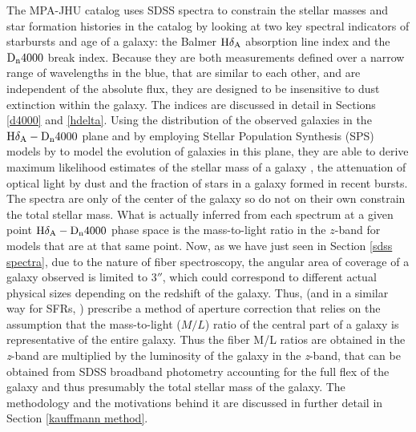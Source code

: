 The MPA-JHU catalog uses SDSS spectra to constrain the stellar masses and star formation histories in the catalog by looking at two key spectral indicators of starbursts and age of a galaxy: the Balmer ${\rm H}\delta_{\rm A}$ absorption line index and the ${\rm D}_{\rm n}4000$ break index.   Because they are both measurements defined over a narrow range of wavelengths in the blue, that are similar to each other, and are independent of the absolute flux, they are designed to be insensitive to dust extinction within the galaxy. The indices are discussed in detail in Sections \ref{d4000} and \ref{hdelta}. Using the distribution of the observed galaxies in the ${\rm H}\delta_{\rm A}-{\rm D}_{\rm n}4000$ plane and by employing Stellar Population Synthesis (SPS) models by \citet{bruzual_stellar_2003-1} to model the evolution of galaxies in this plane, they are able to derive maximum likelihood estimates of the stellar mass of a galaxy \citep{kauffmann_stellar_2003}, the attenuation of optical light by dust and the fraction of stars in a galaxy formed in recent bursts.\\

The spectra are only of the center of the galaxy so do not on their own constrain the total stellar mass. What is actually inferred from each spectrum at a given point ${\rm H}\delta_{\rm A}-{\rm D}_{\rm n}4000$ phase space is the mass-to-light ratio in the $z$-band for models that are at that same point. Now, as we have just seen in Section \ref{sdss spectra}, due to the nature of fiber spectroscopy, the angular area of coverage of a galaxy observed is limited to 3$''$, which could correspond to different actual physical sizes depending on the redshift of the galaxy. Thus, \citet{kauffmann_stellar_2003} (and in a similar way for SFRs, \citealt{brinchmann_physical_2004}) prescribe a method of aperture correction that relies on the assumption that the mass-to-light ($M/L$) ratio of the central part of a galaxy is representative of the entire galaxy. Thus the fiber M/L ratios are obtained in the \emph{z}-band are multiplied by the luminosity of the galaxy in the \emph{z}-band, that can be obtained from SDSS broadband photometry accounting for 
the full flex of the galaxy and thus presumably the 
total stellar mass of the galaxy. The methodology and the motivations behind it are discussed in further detail in Section \ref{kauffmann method}.\\

